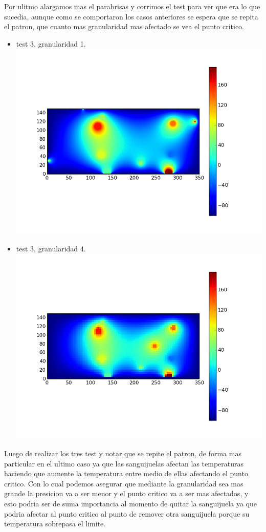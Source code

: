 Por ulitmo alargamos mas el parabrisas y corrimos el test para ver que era lo que sucedia, aunque como se comportaron los casos anteriores se espera que se repita el patron, que cuanto mas granularidad mas afectado se vea el punto critico.
\begin{itemize}
 \item test 3, granularidad 1.\\
  \includegraphics[width=400pt]{imagenes/testpropios/test31.png}

 \item test 3, granularidad 4.\\
  \includegraphics[width=400pt]{imagenes/testpropios/test34.png}
\end{itemize}
Luego de realizar los tres test y notar que se repite el patron,  de forma mas particular en el ultimo caso ya que las sanguijuelas afectan las temperaturas haciendo que aumente la temperatura entre medio de ellas afectando el punto critico.
Con lo cual podemos asegurar que mediante la granularidad sea mas grande la presicion va a ser menor y el punto critico va a ser mas afectados, y esto podria ser de suma importancia al momento de quitar la sanguijuela ya que podria afectar al punto critico al punto de remover otra sanguijuela porque su temperatura sobrepasa el limite.




